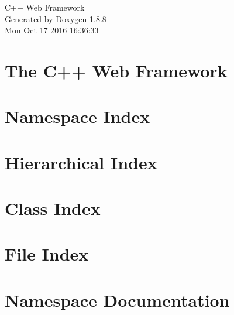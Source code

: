 \documentclass[twoside]{book}
\newcommand{\+}{\discretionary{\mbox{\scriptsize$\hookleftarrow$}}{}{}}
\newcommand{\clearemptydoublepage}{%
  \newpage{\pagestyle{empty}\cleardoublepage}%
}
\begin{document}
\hypersetup{pageanchor=false,
             bookmarks=true,
             bookmarksnumbered=true,
             pdfencoding=unicode
            }
\begin{titlepage}
\vspace*{7cm}
\begin{center}%
{\Large C++ Web Framework }\\
\vspace*{1cm}
{\large Generated by Doxygen 1.8.8}\\
\vspace*{0.5cm}
{\small Mon Oct 17 2016 16:36:33}\\
\end{center}
\end{titlepage}
\clearemptydoublepage
\tableofcontents
\clearemptydoublepage
{}
\hypersetup{pageanchor=true}

\chapter{The C++ Web Framework}
\label{index}\hypertarget{index}{}
\chapter{Namespace Index}

\chapter{Hierarchical Index}

\chapter{Class Index}

\chapter{File Index}

\chapter{Namespace Documentation}

\end{document}
